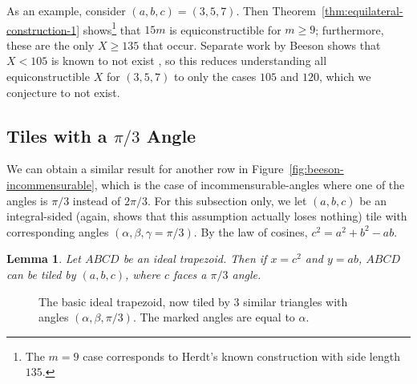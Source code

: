 \documentclass{amsart}
\theoremstyle{plain}
\newtheorem{lem}{Lemma}
\theoremstyle{definition}
\begin{document}
As an example, consider $(a,b,c) = (3,5,7)$. Then Theorem~\ref{thm:equilateral-construction-1} shows\footnote{The $m=9$ case corresponds to Herdt's known construction with side length $135$.} that $15m$ is equiconstructible for $m \geq 9$; furthermore, these are the only $X \geq 135$ that occur. Separate work by Beeson shows that $X < 105$ is known to not exist \cite{beeson-equilateral}, so this reduces understanding all equiconstructible $X$ for $(3,5,7)$ to only the cases $105$ and $120$, which we conjecture to not exist. 

\subsection{Tiles with a $\pi/3$ Angle}

We can obtain a similar result for another row in Figure~\ref{fig:beeson-incommensurable}, which is the case of incommensurable-angles where one of the angles is $\pi/3$ instead of $2\pi/3$. For this subsection only, we let $(a,b,c)$ be an integral-sided (again, \cite{laczkovich2012tilings} shows that this assumption actually loses nothing) tile with corresponding angles $(\alpha, \beta, \gamma = \pi/3).$ By the law of cosines, $c^2 = a^2 + b^2-ab$. 

\begin{lem}
    \label{lem:trapezoid-simple-alt} Let $ABCD$ be an ideal trapezoid.  Then if $x = c^2$ and $y = ab$, $ABCD$ can be tiled by $(a,b,c)$, where $c$ faces a $\pi/3$ angle.
\end{lem}

\begin{figure}
    \centering
{}
    \caption{The basic ideal trapezoid, now tiled by $3$ similar triangles with angles $(\alpha, \beta, \pi/3)$. The marked angles are equal to $\alpha$.}
    \label{fig:ideal-trapezoid-basic-alt}
\end{figure}
\end{document}
